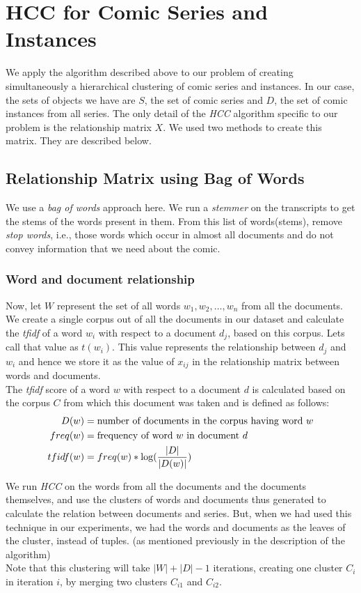 \documentclass[11pt]{article}
\begin{document}
\section{HCC for Comic Series and Instances}
We apply the algorithm described above to our problem of creating simultaneously a hierarchical clustering of comic series and instances.
In our case, the sets of objects we have are $S$, the set of comic series and $D$, the set of comic instances from all series. The only detail of the \emph{HCC} algorithm specific to our problem is the relationship matrix $X$.
We used two methods to create this matrix. They are described below.
\subsection{Relationship Matrix using Bag of Words}
We use a \emph{bag of words} approach here. We run a \emph{stemmer} \cite{stemmer} on the transcripts to get the stems of the words present in them. From this list of words(stems), remove \emph{stop words}, i.e., those words which occur in almost all documents and do not convey information that we need about the comic.
\subsubsection{Word and document relationship}
Now, let $W$ represent the set of all words $w_1,w_2,\ldots,w_n$ from all the documents. We create a single corpus out of all the documents in our dataset and calculate the \emph{tfidf} of a word $w_i$ with respect to a document $d_j$, based on this corpus. Lets call that value as $t(w_i)$. This value represents the relationship between $d_j$ and $w_i$ and hence we store it as the value of $x_{ij}$ in the relationship matrix between words and documents.\\
The \emph{tfidf} score of a word $w$ with respect to a document $d$ is calculated based on the corpus $C$ from which this document was taken and is defined as follows:
\begin{align*}
  D(w)&=\textrm{number of documents in the corpus having word } w\\
  freq(w)&=\textrm{frequency of word } w \textrm{ in document } d\\
  tfidf(w)&=freq(w)*\log \Huge(\frac{|D|}{|D(w)|}\Huge)
\end{align*}

We run \emph{HCC} on the words from all the documents and the documents themselves, and use the clusters of words and documents thus generated to calculate the relation between documents and series. But, when we had used this technique in our experiments, we had the words and documents as the leaves of the cluster, instead of tuples. (as mentioned previously in the description of the algorithm)\\
Note that this clustering will take $|W|+|D|-1$ iterations, creating one cluster $C_i$ in iteration $i$, by merging two clusters $C_{i1}$ and $C_{i2}$.
\end{document}
